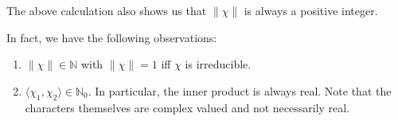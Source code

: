 \begin{rem} \label{rem:normcharacisnatural}
	The above calculation also shows us that $\|\chi\|$ is always a positive integer.
\end{rem}
\begin{cor} \label{cor:innerprodproperties}
	In fact, we have the following observations:
	\begin{enumerate}
		\item $\|\chi\| \in \mathbb{N}$ with $\|\chi\| = 1$ iff $\chi$ is irreducible.
		\item $\langle \chi_1, \chi_2\rangle \in \mathbb{N}_0.$ In particular, the inner product is always real. Note that the characters themselves are complex valued and not necessarily real.
	\end{enumerate}
\end{cor}

